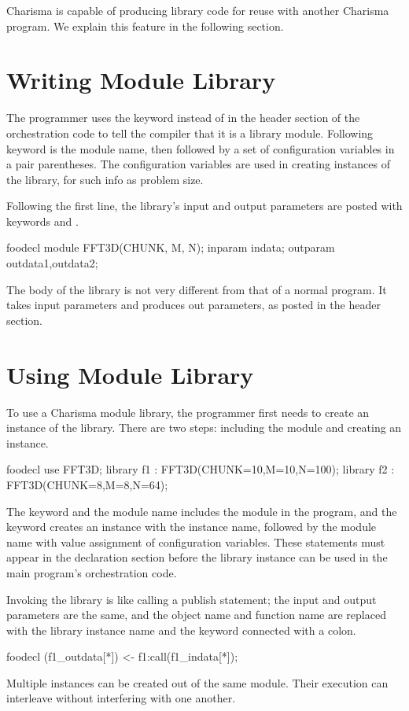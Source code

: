Charisma is capable of producing library code for reuse with another Charisma
program. We explain this feature in the following section.

\section{Writing Module Library}

The programmer uses the keyword  instead of  in the
header section of the orchestration code to tell the compiler that it is a
library module. Following keyword  is the module name, then
followed by a set of configuration variables in a pair parentheses. The 
configuration variables are used in creating instances of the library, for
such info as problem size. 

Following the first line, the library's input and output parameters are posted
with keywords  and . 

\begin{SaveVerbatim}{foodecl}
  module FFT3D(CHUNK, M, N);
  inparam indata;
  outparam outdata1,outdata2;
\end{SaveVerbatim}

The body of the library is not very different from that of a normal program. It
takes input parameters and produces out parameters, as posted in the header
section. 

\section{Using Module Library}

To use a Charisma module library, the programmer first needs to create an
instance of the library. There are two steps: including the module and creating
an instance. 

\begin{SaveVerbatim}{foodecl}
  use FFT3D;
  library f1 : FFT3D(CHUNK=10,M=10,N=100);
  library f2 : FFT3D(CHUNK=8,M=8,N=64);
\end{SaveVerbatim}

The keyword  and the module name includes the module in the program,
and the keyword  creates an instance with the instance name,
followed by the module name with value assignment of configuration variables. 
These statements must appear in the declaration section before the library
instance can be used in the main program's orchestration code. 

Invoking the library is like calling a publish statement; the input and output
parameters are the same, and the object name and function name are replaced with
the library instance name and the keyword  connected with a colon. 

\begin{SaveVerbatim}{foodecl}
  (f1_outdata[*]) <- f1:call(f1_indata[*]);
\end{SaveVerbatim}

Multiple instances can be created out of the same module. Their execution can
interleave without interfering with one another. 
